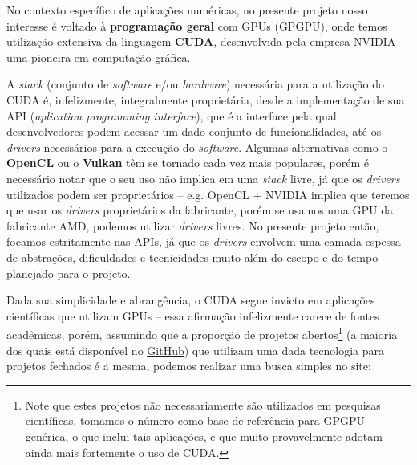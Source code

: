 \documentclass[10pt, a4paper, conference, onecolumn]{IEEEtran}
\begin{document}
No contexto específico de aplicações numéricas, no presente projeto nosso
interesse é voltado à \textbf{programação geral} com GPUs (GPGPU), onde temos
utilização extensiva da linguagem \textbf{CUDA}, desenvolvida pela empresa
NVIDIA -- uma pioneira em computação gráfica.

A \textit{stack} (conjunto de \textit{software} e/ou \textit{hardware}) necessária
para a utilização do CUDA é, infelizmente, integralmente proprietária, desde a
implementação de sua API (\textit{aplication programming interface}), que é a
interface pela qual desenvolvedores podem acessar um dado conjunto de
funcionalidades, até os \textit{drivers} necessários para a execução do
\textit{software}. Algumas alternativas como o \textbf{OpenCL} ou o
\textbf{Vulkan} têm se tornado cada vez mais populares, porém é necessário
notar que o seu uso não implica em uma \textit{stack} livre, já que os
\textit{drivers} utilizados podem ser proprietários -- e.g. OpenCL + NVIDIA
implica que teremos que usar os \textit{drivers} proprietários da fabricante,
porém se usamos uma GPU da fabricante AMD, podemos utilizar \textit{drivers}
livres.
No presente projeto então, focamos estritamente nas APIs, já que os
\textit{drivers} envolvem uma camada espessa de abstrações, dificuldades e
tecnicidades muito além do escopo e do tempo planejado para o projeto.

Dada sua simplicidade e abrangência, o CUDA segue invicto em aplicações
científicas que utilizam GPUs -- essa afirmação infelizmente carece de fontes
acadêmicas, porém, assumindo que a proporção de projetos abertos\footnote{
    \label{footnote:cuda-github}
    Note que estes projetos não necessariamente são utilizados em pesquisas científicas,
    tomamos o número como base de referência para GPGPU genérica, o que inclui
    tais aplicações, e que muito provavelmente adotam ainda mais fortemente o
    uso de CUDA.
} (a maioria
dos quais está disponível no \href{https://github.com}{GitHub}) que utilizam
uma dada tecnologia para projetos fechados é a mesma, podemos realizar uma
busca simples no site:
\end{document}
